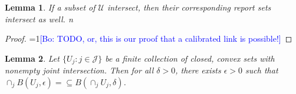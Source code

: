 \documentclass{article}
\newcommand{\Comments}{1}
\newcommand{\mynote}[2]{\ifnum\Comments=1\textcolor{#1}{#2}\fi}
\newcommand{\bo}[1]{\mynote{blue}{[Bo: #1]}}
\newtheorem{lemma}{Lemma}
\begin{document}
\begin{lemma} \label{lemma:calibrated-pos}
  If a subset of $\mathcal{U}$ intersect, then their corresponding report sets intersect as well.
n
\end{lemma}
\begin{proof}
  \bo{TODO, or, this is our proof that a calibrated link is possible!}
\end{proof}

%
\begin{lemma} \label{lemma:thick-nonempty}
  Let $\{U_j : j \in \mathcal{J}\}$ be a finite collection of closed, convex sets with nonempty joint intersection.
  Then for all $\delta > 0$, there exists  $\epsilon > 0$ such that $\cap_j B(U_j,\epsilon) = \subseteq B(\cap_j U_j, \delta)$.
\end{lemma}
\end{document}
